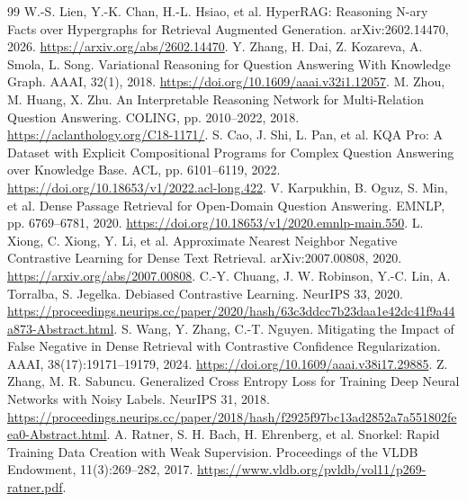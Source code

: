 \documentclass[UTF8,a4paper,10pt,fontset=fandol]{ctexart}
\begin{document}
\begin{thebibliography}{99}
 W.-S. Lien, Y.-K. Chan, H.-L. Hsiao, et al. HyperRAG: Reasoning N-ary Facts over Hypergraphs for Retrieval Augmented Generation. arXiv:2602.14470, 2026. \url{https://arxiv.org/abs/2602.14470}.
 Y. Zhang, H. Dai, Z. Kozareva, A. Smola, L. Song. Variational Reasoning for Question Answering With Knowledge Graph. AAAI, 32(1), 2018. \url{https://doi.org/10.1609/aaai.v32i1.12057}.
 M. Zhou, M. Huang, X. Zhu. An Interpretable Reasoning Network for Multi-Relation Question Answering. COLING, pp. 2010--2022, 2018. \url{https://aclanthology.org/C18-1171/}.
 S. Cao, J. Shi, L. Pan, et al. KQA Pro: A Dataset with Explicit Compositional Programs for Complex Question Answering over Knowledge Base. ACL, pp. 6101--6119, 2022. \url{https://doi.org/10.18653/v1/2022.acl-long.422}.
 V. Karpukhin, B. Oguz, S. Min, et al. Dense Passage Retrieval for Open-Domain Question Answering. EMNLP, pp. 6769--6781, 2020. \url{https://doi.org/10.18653/v1/2020.emnlp-main.550}.
 L. Xiong, C. Xiong, Y. Li, et al. Approximate Nearest Neighbor Negative Contrastive Learning for Dense Text Retrieval. arXiv:2007.00808, 2020. \url{https://arxiv.org/abs/2007.00808}.
 C.-Y. Chuang, J. W. Robinson, Y.-C. Lin, A. Torralba, S. Jegelka. Debiased Contrastive Learning. NeurIPS 33, 2020. \url{https://proceedings.neurips.cc/paper/2020/hash/63c3ddcc7b23daa1e42dc41f9a44a873-Abstract.html}.
 S. Wang, Y. Zhang, C.-T. Nguyen. Mitigating the Impact of False Negative in Dense Retrieval with Contrastive Confidence Regularization. AAAI, 38(17):19171--19179, 2024. \url{https://doi.org/10.1609/aaai.v38i17.29885}.
 Z. Zhang, M. R. Sabuncu. Generalized Cross Entropy Loss for Training Deep Neural Networks with Noisy Labels. NeurIPS 31, 2018. \url{https://proceedings.neurips.cc/paper/2018/hash/f2925f97bc13ad2852a7a551802feea0-Abstract.html}.
 A. Ratner, S. H. Bach, H. Ehrenberg, et al. Snorkel: Rapid Training Data Creation with Weak Supervision. Proceedings of the VLDB Endowment, 11(3):269--282, 2017. \url{https://www.vldb.org/pvldb/vol11/p269-ratner.pdf}.
\end{thebibliography}
\end{document}
